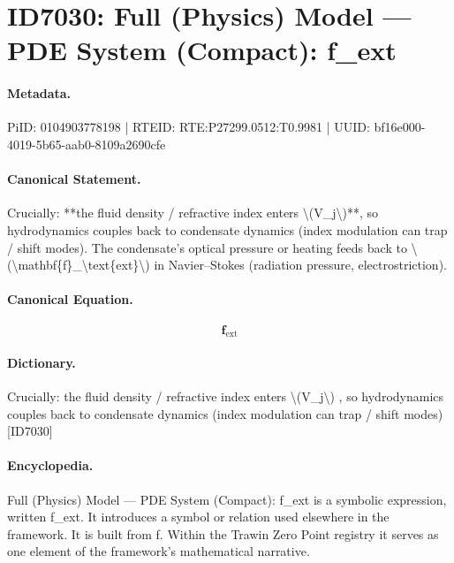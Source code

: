 \section*{ID7030: Full (Physics) Model — PDE System (Compact): f\_ext}
\paragraph{Metadata.}
PiID: 0104903778198 | RTEID: RTE:P27299.0512:T0.9981 | UUID: bf16e000-4019-5b65-aab0-8109a2690cfe

\paragraph{Canonical Statement.}
Crucially: **the fluid density / refractive index enters \textbackslash{}(V\_j\textbackslash{})**, so hydrodynamics couples back to condensate dynamics (index modulation can trap / shift modes). The condensate’s optical pressure or heating feeds back to \textbackslash{}(\textbackslash{}mathbf\{f\}\_\textbackslash{}text\{ext\}\textbackslash{}) in Navier–Stokes (radiation pressure, electrostriction).

\paragraph{Canonical Equation.}
\[
\mathbf{f}_\text{ext}
\]

\paragraph{Dictionary.}
Crucially: the fluid density / refractive index enters \textbackslash{}(V\_j\textbackslash{}) , so hydrodynamics couples back to condensate dynamics (index modulation can trap / shift modes) [ID7030]

\paragraph{Encyclopedia.}
Full (Physics) Model — PDE System (Compact): f\_ext is a symbolic expression, written f\_ext. It introduces a symbol or relation used elsewhere in the framework. It is built from f. Within the Trawin Zero Point registry it serves as one element of the framework's mathematical narrative.
